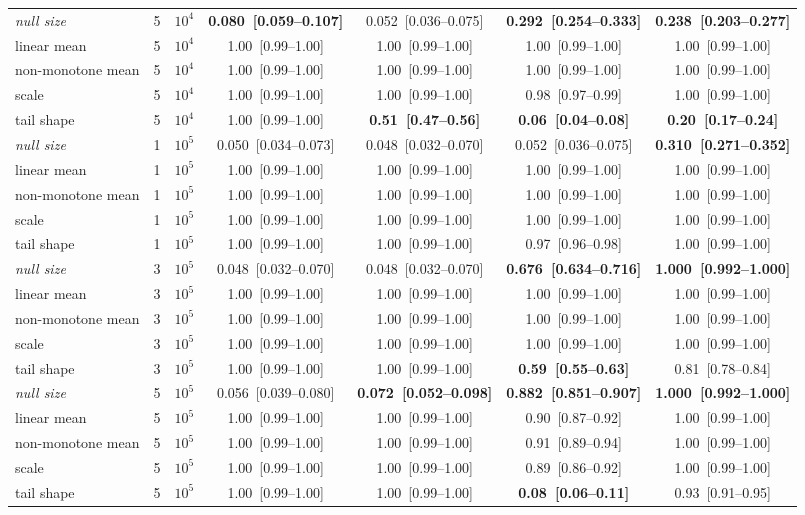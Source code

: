 \begin{table}[p]
{\begin{tabular}{llrcccc}
\midrule
\emph{null size} & 5 & $10^4$ & \textbf{0.080~[0.059--0.107]} & 0.052~[0.036--0.075] & \textbf{0.292~[0.254--0.333]} & \textbf{0.238~[0.203--0.277]} \\
linear mean & 5 & $10^4$ & 1.00~[0.99--1.00] & 1.00~[0.99--1.00] & 1.00~[0.99--1.00] & 1.00~[0.99--1.00] \\
non-monotone mean & 5 & $10^4$ & 1.00~[0.99--1.00] & 1.00~[0.99--1.00] & 1.00~[0.99--1.00] & 1.00~[0.99--1.00] \\
scale & 5 & $10^4$ & 1.00~[0.99--1.00] & 1.00~[0.99--1.00] & 0.98~[0.97--0.99] & 1.00~[0.99--1.00] \\
tail shape & 5 & $10^4$ & 1.00~[0.99--1.00] & \textbf{0.51~[0.47--0.56]} & \textbf{0.06~[0.04--0.08]} & \textbf{0.20~[0.17--0.24]} \\
\midrule
\emph{null size} & 1 & $10^5$ & 0.050~[0.034--0.073] & 0.048~[0.032--0.070] & 0.052~[0.036--0.075] & \textbf{0.310~[0.271--0.352]} \\
linear mean & 1 & $10^5$ & 1.00~[0.99--1.00] & 1.00~[0.99--1.00] & 1.00~[0.99--1.00] & 1.00~[0.99--1.00] \\
non-monotone mean & 1 & $10^5$ & 1.00~[0.99--1.00] & 1.00~[0.99--1.00] & 1.00~[0.99--1.00] & 1.00~[0.99--1.00] \\
scale & 1 & $10^5$ & 1.00~[0.99--1.00] & 1.00~[0.99--1.00] & 1.00~[0.99--1.00] & 1.00~[0.99--1.00] \\
tail shape & 1 & $10^5$ & 1.00~[0.99--1.00] & 1.00~[0.99--1.00] & 0.97~[0.96--0.98] & 1.00~[0.99--1.00] \\
\midrule
\emph{null size} & 3 & $10^5$ & 0.048~[0.032--0.070] & 0.048~[0.032--0.070] & \textbf{0.676~[0.634--0.716]} & \textbf{1.000~[0.992--1.000]} \\
linear mean & 3 & $10^5$ & 1.00~[0.99--1.00] & 1.00~[0.99--1.00] & 1.00~[0.99--1.00] & 1.00~[0.99--1.00] \\
non-monotone mean & 3 & $10^5$ & 1.00~[0.99--1.00] & 1.00~[0.99--1.00] & 1.00~[0.99--1.00] & 1.00~[0.99--1.00] \\
scale & 3 & $10^5$ & 1.00~[0.99--1.00] & 1.00~[0.99--1.00] & 1.00~[0.99--1.00] & 1.00~[0.99--1.00] \\
tail shape & 3 & $10^5$ & 1.00~[0.99--1.00] & 1.00~[0.99--1.00] & \textbf{0.59~[0.55--0.63]} & 0.81~[0.78--0.84] \\
\midrule
\emph{null size} & 5 & $10^5$ & 0.056~[0.039--0.080] & \textbf{0.072~[0.052--0.098]} & \textbf{0.882~[0.851--0.907]} & \textbf{1.000~[0.992--1.000]} \\
linear mean & 5 & $10^5$ & 1.00~[0.99--1.00] & 1.00~[0.99--1.00] & 0.90~[0.87--0.92] & 1.00~[0.99--1.00] \\
non-monotone mean & 5 & $10^5$ & 1.00~[0.99--1.00] & 1.00~[0.99--1.00] & 0.91~[0.89--0.94] & 1.00~[0.99--1.00] \\
scale & 5 & $10^5$ & 1.00~[0.99--1.00] & 1.00~[0.99--1.00] & 0.89~[0.86--0.92] & 1.00~[0.99--1.00] \\
tail shape & 5 & $10^5$ & 1.00~[0.99--1.00] & 1.00~[0.99--1.00] & \textbf{0.08~[0.06--0.11]} & 0.93~[0.91--0.95] \\
\bottomrule
\end{tabular}}
\end{table}

